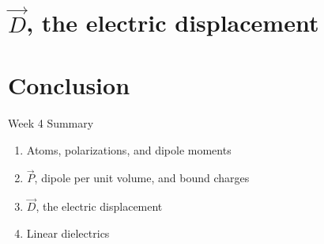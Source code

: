 \documentclass{beamer}
\begin{document}
\section{$\vec{D}$, the electric displacement}

\section{Conclusion}

\begin{frame}{Week 4 Summary}
\begin{enumerate}
\item Atoms, polarizations, and dipole moments
\item $\vec{P}$, dipole per unit volume, and bound charges
\item $\vec{D}$, the electric displacement
\item Linear dielectrics
\end{enumerate}
\end{frame}
\end{document}
